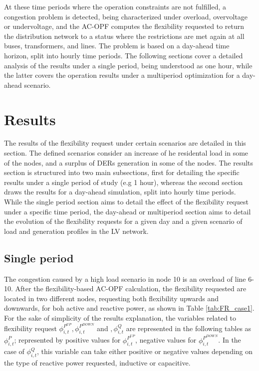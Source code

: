 At these time periods where the operation constraints are not fulfilled, a congestion problem is detected, being characterized under overload, overvoltage or undervoltage, and the AC-OPF computes the flexibility requested to return the distribution network to a status where the restrictions are met again at all buses, transformers, and lines. The problem is based on a day-ahead time horizon, split into hourly time periods. The following sections cover a detailed analysis of the results under a single period, being understood as one hour, while the latter covers the operation results under a multiperiod optimization for a day-ahead scenario.  

\section{Results}
The results of the flexibility request under certain scenarios are detailed in this section. The defined scenarios consider an increase of he residental load in some of the nodes, and a surplus of DERs generation in some of the nodes. The results section is structured into two main subsections, first for detailing the specific results under a single period of study (e.g 1 hour), whereas the second section draws the results for a day-ahead simulation, split into hourly time periods. While the single period section aims to detail the effect of the flexibility request under a specific time period, the day-ahead or multiperiod section aims to detail the evolution of the flexibility requests for a given day and a given scenario of load and generation profiles in the LV network. 
\subsection{Single period}
The congestion caused by a high load scenario in node 10 is an overload of line 6-10. After the flexibility-based AC-OPF calculation, the flexibility requested are located in two different nodes, requesting both flexibility upwards and downwards, for boh active and reactive power, as shown in Table \ref{tab:FR_case1}. For the sake of simplicity of the results explanation, the variables related to flexibility request $\phi_{i,t}^{P^{UP}},\phi_{i,t}^{P^{DOWN}}$ and $,\phi_{i,t}^{Q}$ are represented in the following tables as $\phi_{i,t}^{P}$; represented by positive values for $\phi_{i,t}^{P^{UP}}$, negative values for $\phi_{i,t}^{P^{DOWN}}$. In the case of $\phi_{i,t}^{Q}$, this variable can take either positive or negative values depending on the type of reactive power requested, inductive or capacitive. 

